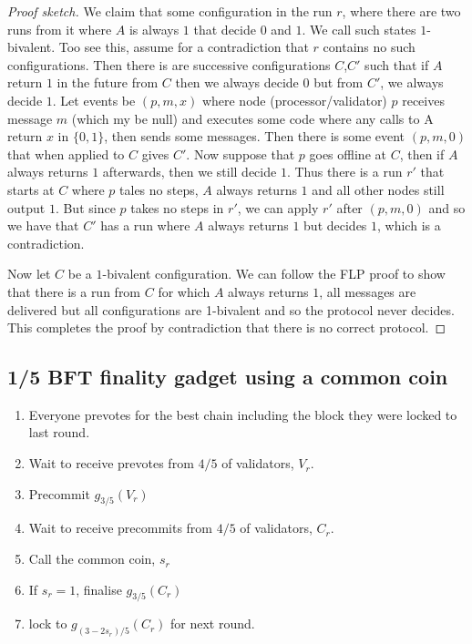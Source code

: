 \documentclass{article}
\begin{document}
{\begin{proof}[Proof sketch]
We claim that some configuration in the run $r$, where there are two runs from it where $A$ is always $1$ that decide $0$ and $1$. We call such states $1$-bivalent. Too see this, assume for a contradiction that $r$ contains no such configurations. Then there is are successive configurations $C$,$C'$ such that if $A$ return $1$ in the future from $C$ then we always decide $0$ but from $C'$, we always decide $1$.  Let events be $(p,m,x)$ where node (processor/validator) $p$ receives message $m$ (which my be null) and executes some code where any calls to A return $x$ in $\{0,1\}$, then sends some messages. Then there is some event $(p,m,0)$ that when applied to $C$ gives $C'$. Now suppose that $p$ goes offline at $C$, then if $A$ always returns $1$ afterwards, then we still decide $1$. Thus there is a run $r'$ that starts at $C$ where $p$ tales no steps, $A$ always returns $1$ and all other nodes still output $1$.
But since $p$ takes no steps in $r'$, we can apply $r'$ after $(p, m, 0)$ and so we have that $C'$ has a run where $A$ always returns $1$ but decides $1$, which is a contradiction.

Now let $C$ be a $1$-bivalent configuration. We can follow the FLP proof to show that there is a run from $C$ for which $A$ always returns $1$, all messages are delivered but all configurations are 1-bivalent and so the protocol never decides. This completes the proof by contradiction that there is no correct protocol.
\end{proof}

\subsection{1/5 BFT finality gadget using a common coin}

\begin{enumerate}
\item Everyone prevotes for the best chain including the block they were locked to last round.
\item Wait to receive prevotes from $4/5$ of validators, $V_r$.
\item Precommit $g_{3/5}(V_r)$
\item Wait to receive precommits from $4/5$ of validators, $C_r$. 
\item Call the common coin, $s_r$
\item If $s_r=1$, finalise $g_{3/5}(C_r)$
\item lock to $g_{(3-2s_r)/5}(C_r)$ for next round.
\end{enumerate}

}
\end{document}
